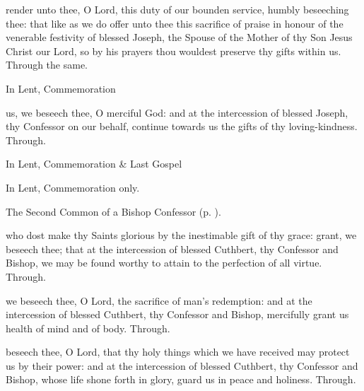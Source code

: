 
\secret
{} render unto thee, O Lord, this duty of our bounden service, humbly beseeching thee: that like as we do offer unto thee this sacrifice of praise in honour of the venerable festivity of blessed Joseph, the Spouse of the Mother of thy Son Jesus Christ our Lord, so by his prayers thou wouldest preserve thy gifts within us. Through the same.
\begin{rubric}
    In Lent, Commemoration 
\end{rubric}


\postcommunion
{} us, we beseech thee, O merciful God: and at the intercession of blessed Joseph, thy Confessor on our behalf, continue towards us the gifts of thy loving-kindness. Through.

\begin{rubric}
    In Lent, Commemoration \& Last Gospel 
\end{rubric}



\begin{rubric}
	In Lent, Commemoration only.
\end{rubric}

\begin{rubric}
	The Second Common of a Bishop Confessor (p. \pageref{CommonConfessorBishopII}).
\end{rubric}

\collect
{} who dost make thy Saints glorious by the inestimable gift of thy grace: grant, we beseech thee; that at the intercession of blessed Cuthbert, thy Confessor and Bishop, we may be found worthy to attain to the perfection of all virtue. Through.

\secret
{} we beseech thee, O Lord, the sacrifice of man's redemption: and at the intercession of blessed Cuthbert, thy Confessor and Bishop, mercifully grant us health of mind and of body. Through.

\postcommunion
{} beseech thee, O Lord, that thy holy things which we have received may protect us by their power: and at the intercession of blessed Cuthbert, thy Confessor and Bishop, whose life shone forth in glory, guard us in peace and holiness. Through.


